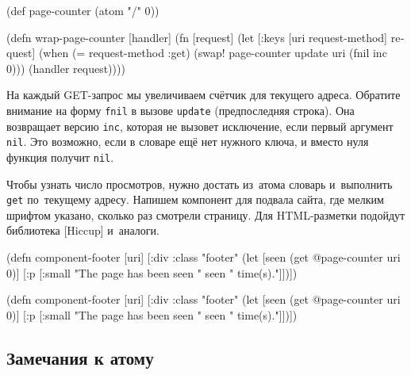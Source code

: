 \else

\begin{english}
  \begin{clojure}
(def page-counter
  (atom {"/" 0}))

(defn wrap-page-counter
  [handler]
  (fn [request]
    (let [{:keys [uri request-method]} request]
      (when (= request-method :get)
        (swap! page-counter update uri (fnil inc 0)))
      (handler request))))
  \end{clojure}
\end{english}

\fi


На каждый GET-запрос мы увеличиваем счётчик для текущего адреса. Обратите
внимание на форму \verb|fnil| в вызове \verb|update| (предпоследняя строка). Она
возвращает версию \verb|inc|, которая не вызовет исключение, если первый
аргумент \verb|nil|. Это возможно, если в словаре ещё нет нужного ключа, и
вместо нуля функция получит \verb|nil|.


Чтобы узнать число просмотров, нужно достать из~атома словарь и~выполнить
\verb|get| по~текущему адресу. Напишем компонент для подвала сайта, где мелким
шрифтом указано, сколько раз смотрели страницу. Для HTML-разметки подойдут
библиотека [Hiccup]
и~аналоги.

\ifnarrow

\begin{english}
  \begin{clojure}
(defn component-footer [uri]
  [:div {:class "footer"}
   (let [seen (get @page-counter uri 0)]
     [:p [:small
          "The page has been seen " seen
          " time(s)."]])])
  \end{clojure}
\end{english}

\else

\begin{english}
  \begin{clojure}
(defn component-footer [uri]
  [:div {:class "footer"}
   (let [seen (get @page-counter uri 0)]
     [:p [:small "The page has been seen "
                 seen
                 " time(s)."]])])
  \end{clojure}
\end{english}

\fi

\subsection{Замечания к атому}

